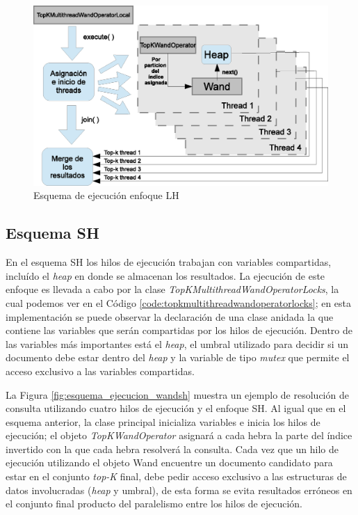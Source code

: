\begin{figure}[th!]
\centering
\includegraphics[scale=.75]{images/ejecucion_topkmultithreadwandopLOCAL.eps}
\caption{Esquema de ejecución enfoque LH}
\label{fig:esquema_ejecucion_wandlh}
\end{figure}

\subsection{Esquema SH}
\label{evaluacionexperimental:esquemash}
En el esquema SH los hilos de ejecución trabajan con variables compartidas, incluído el \textit{heap} en donde se almacenan los resultados. La ejecución de este enfoque es llevada a cabo por la clase \textit{TopKMultithreadWandOperatorLocks}, la cual podemos ver en el Código \ref{code:topkmultithreadwandoperatorlocks}; en esta implementación se puede observar la declaración de una clase anidada la que contiene las variables que serán compartidas por los hilos de ejecución. Dentro de las variables más importantes está el \textit{heap}, el umbral utilizado para decidir si un documento debe estar dentro del \textit{heap} y la variable de tipo \textit{mutex} que permite el acceso exclusivo a las variables compartidas. 



La Figura \ref{fig:esquema_ejecucion_wandsh} muestra un ejemplo de resolución de consulta utilizando cuatro hilos de ejecución y el enfoque SH. Al igual que en el esquema anterior, la clase principal inicializa variables e inicia los hilos de ejecución; el objeto \textit{TopKWandOperator} asignará a cada hebra la parte del índice invertido con la que cada hebra resolverá la consulta. Cada vez que un hilo de ejecución utilizando el objeto Wand encuentre un documento candidato para estar en el conjunto \textit{top-K} final, debe pedir acceso exclusivo a las estructuras de datos involucradas (\textit{heap} y umbral), de esta forma se evita resultados erróneos en el conjunto final producto del paralelismo entre los hilos de ejecución.  

